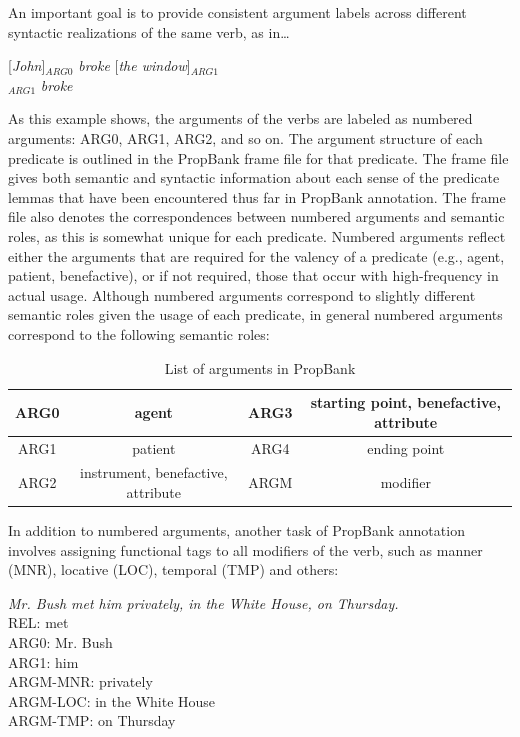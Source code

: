 \documentclass[11pt]{report}
\begin{document}
\noindent An important goal is to provide consistent argument labels across different syntactic realizations of the same verb, as in\ldots

[\textit{John}]$_{ARG0}$ \textit{broke} [\textit{the window}]$_{ARG1}$ \\ $_{ARG1}$ \textit{broke}

\noindent As this example shows, the arguments of the verbs are labeled as numbered arguments: ARG0, ARG1, ARG2, and so on.  The argument structure of each predicate is outlined in the PropBank frame file for that predicate.  The frame file gives both semantic and syntactic information about each sense of the predicate lemmas that have been encountered thus far in PropBank annotation.  The frame file also denotes the correspondences between numbered arguments and semantic roles, as this is somewhat unique for each predicate.  Numbered arguments reflect either the arguments that are required for the valency of a predicate (e.g., agent, patient, benefactive), or if not required, those that occur with high-frequency in actual usage.  Although numbered arguments correspond to slightly different semantic roles given the usage of each predicate, in general numbered arguments correspond to the following semantic roles: 

\begin{table}[htdp]
\centering
\begin{tabular}{|c|c||c|c|}
\hline ARG0 & agent   & ARG3 & starting point, benefactive, attribute\\
\hline ARG1 & patient & ARG4 & ending point\\
\hline ARG2 & instrument, benefactive, attribute & ARGM & modifier\\
\hline 
\end{tabular}
\caption{List of arguments in PropBank}
\label{tbl:arguments}
\end{table}

\noindent In addition to numbered arguments, another task of PropBank annotation involves assigning functional tags to all modifiers of the verb, such as manner (MNR), locative (LOC), temporal (TMP) and others:

\textit{Mr. Bush met him privately, in the White House, on Thursday.} \\
REL:  met \\
ARG0: Mr. Bush \\ 
ARG1: him \\
ARGM-MNR: privately \\
ARGM-LOC: in the White House \\
ARGM-TMP: on Thursday
\end{document}
